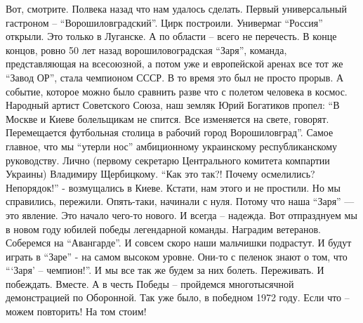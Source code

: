 Вот, смотрите. Полвека назад что нам удалось сделать. Первый универсальный
гастроном – \enquote{Ворошиловградский}. Цирк построили. Универмаг \enquote{Россия} открыли.
Это только в Луганске. А по области – всего не перечесть. В конце концов, ровно
50 лет назад ворошиловоградская \enquote{Заря}, команда, представляющая на всесоюзной,
а потом уже и европейской аренах все тот же \enquote{Завод ОР}, стала чемпионом СССР. В
то время это был не просто прорыв. А событие, которое можно было сравнить разве
что с полетом человека в космос. Народный артист Советского Союза, наш земляк
Юрий Богатиков пропел: \enquote{В Москве и Киеве болельщикам не спится. Все изменяется
на свете, говорят. Перемещается футбольная столица в рабочий город
Ворошиловград}. Самое главное, что мы \enquote{утерли нос} амбиционному украинскому
республиканскому руководству. Лично (первому секретарю Центрального комитета
компартии Украины) Владимиру Щербицкому. \enquote{Как это так?! Почему осмелились?
Непорядок!} - возмущались в Киеве. Кстати, нам этого и не простили. Но мы
справились, пережили. Опять-таки, начинали с нуля. Потому что наша \enquote{Заря} — это
явление. Это начало чего-то нового. И всегда – надежда. Вот отпразднуем мы в
новом году юбилей победы легендарной команды. Наградим ветеранов. Соберемся на
\enquote{Авангарде}. И совсем скоро наши мальчишки подрастут. И будут играть в \enquote{Заре} -
на самом высоком уровне. Они-то с пеленок знают о том, что \enquote{\enquote{Заря} – чемпион!}.
И мы все так же будем за них болеть. Переживать. И побеждать. Вместе. А в честь
Победы – пройдемся многотысячной демонстрацией по Оборонной. Так уже было, в
победном 1972 году. Если что – можем повторить! На том стоим!
